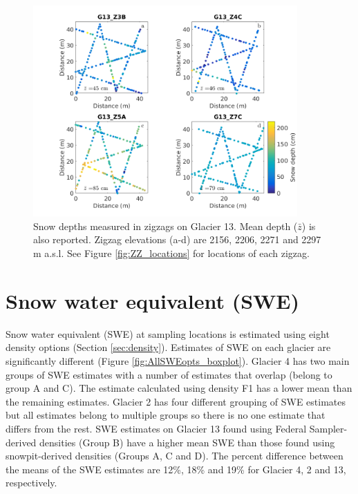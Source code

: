 \documentclass{sfuthesis}
\begin{document}
\begin{figure}[H] 
	\centering
	 \includegraphics[width=0.9\textwidth]{ZigzagDepth_G13.png}%
	\caption{Snow depths measured in zigzags on Glacier 13. Mean depth ($\bar{z}$) is also reported. Zigzag elevations (a-d) are 2156, 2206, 2271 and 2297 m a.s.l. See Figure \ref{fig:ZZ_locations} for locations of each zigzag.}
	\label{fig:ZZ_G13}
\end{figure}


\section{Snow water equivalent (SWE)}

Snow water equivalent (SWE) at sampling locations is estimated using eight density options (Section \ref{sec:density}). Estimates of SWE on each glacier are significantly different (Figure \ref{fig:AllSWEopts_boxplot}). Glacier 4 has two main groups of SWE estimates with a number of estimates that overlap (belong to group A and C). The estimate calculated using density F1 has a lower mean than the remaining estimates. Glacier 2 has four different grouping of SWE estimates but all estimates belong to multiple groups so there is no one estimate that differs from the rest. SWE estimates on Glacier 13 found using Federal Sampler-derived densities (Group B) have a higher mean SWE than those found using snowpit-derived densities (Groups A, C and D). The percent difference between the means of the SWE estimates are 12\%, 18\% and 19\%  for Glacier 4, 2 and 13, respectively. 
\end{document}
